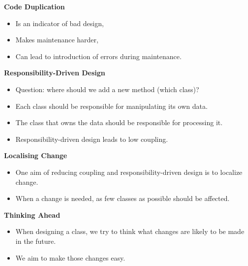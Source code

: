 \documentclass{beamer}
\begin{document}
\begin{frame}
\begin{center}
\textbf{Code Duplication}
\end{center}
\begin{itemize}
\item Is an indicator of bad design,
\item Makes maintenance harder,
\item Can lead to introduction of errors during maintenance.
\end{itemize}
\end{frame}

\begin{frame}
\begin{center}
\textbf{Responsibility-Driven Design}
\end{center}
\begin{itemize}
\item Question: where should we add a new method (which class)?
\item Each class should be responsible for manipulating its own data.
\item The class that owns the data should be responsible for processing it.
\item Responsibility-driven design leads to low coupling.
\end{itemize}
\end{frame}

\begin{frame}
\begin{center}
\textbf{Localising Change}
\end{center}
\begin{itemize}
\item One aim of reducing coupling and responsibility-driven design is to localize change.
\item When a change is needed, as few classes as possible should be affected.
\end{itemize}
\end{frame}

\begin{frame}
\begin{center}
\textbf{Thinking Ahead}
\end{center}
\begin{itemize}
\item When designing a class, we try to think what changes are likely to be made in the future.
\item We aim to make those changes easy.
\end{itemize}
\end{frame}
\end{document}
